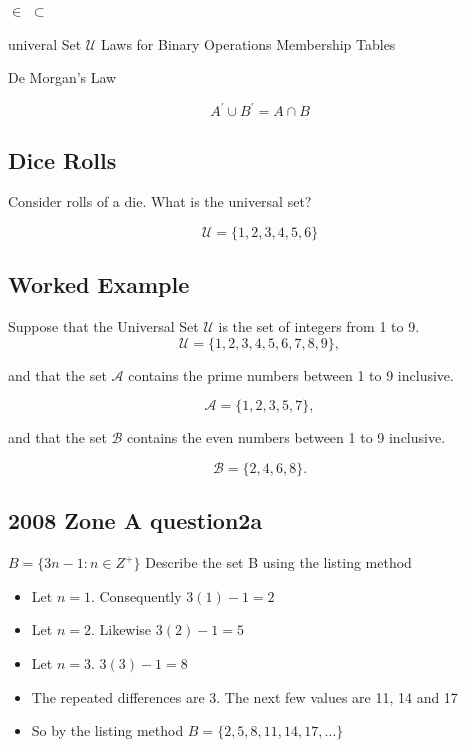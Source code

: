 
$\in$
$\subset$

univeral Set $\mathcal{U}$
Laws for Binary Operations
Membership Tables

De Morgan's Law


\[A^{\prime} \cup B^{\prime} = A \cap B\]



\subsection*{Dice Rolls}
Consider rolls of a die. What is the universal set?

\[ \mathcal{U} = \{1,2,3,4,5,6\} \]

\subsection*{Worked Example}

Suppose that the Universal Set $\mathcal{U}$ is the set of integers from 1 to 9.
\[ \mathcal{U} = \{1,2,3,4,5,6,7,8,9\}, \]

and that the set $\mathcal{A}$ contains the prime numbers between 1 to 9 inclusive.

\[ \mathcal{A} = \{1,2,3,5,7\}, \]

and that the set $\mathcal{B}$ contains the even numbers between 1 to 9 inclusive.

\[ \mathcal{B} = \{2,4,6,8\}. \]




\subsection*{2008  Zone A question2a}
$B = \{3n-1 :n \in Z^{+} \}$
Describe the set B using the listing method

\begin{itemize}
\item Let $n=1$. Consequently $3(1)-1 =2$
\item Let $n=2$. Likewise $3(2)-1 =5$
\item Let $n=3$. $3(3)-1 = 8 $
\item The repeated differences are 3. The next few values are 11, 14 and 17
\item So by the listing method $B= \{2,5,8,11,14,17,\ldots\}$
\end{itemize}

